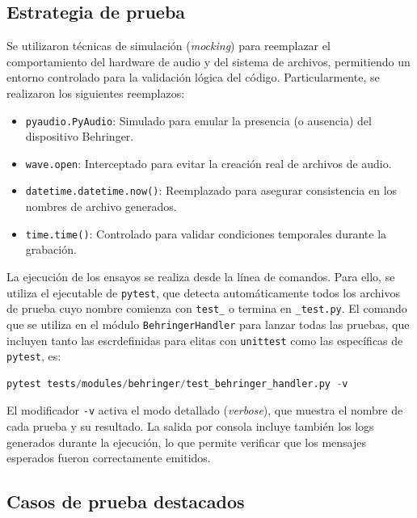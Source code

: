\subsection{Estrategia de prueba}

Se utilizaron técnicas de simulación (\textit{mocking}) para reemplazar el comportamiento del hardware de audio y del sistema de archivos, permitiendo un entorno controlado para la validación lógica del código. Particularmente, se realizaron los siguientes reemplazos:

\begin{itemize} \item \texttt{pyaudio.PyAudio}: Simulado para emular la presencia (o ausencia) del dispositivo Behringer. \item \texttt{wave.open}: Interceptado para evitar la creación real de archivos de audio. \item \texttt{datetime.datetime.now()}: Reemplazado para asegurar consistencia en los nombres de archivo generados. \item \texttt{time.time()}: Controlado para validar condiciones temporales durante la grabación. \end{itemize}

La ejecución de los ensayos se realiza desde la línea de comandos. Para ello, se utiliza el ejecutable de \texttt{pytest}, que detecta automáticamente todos los archivos de prueba cuyo nombre comienza con \texttt{test\_} o termina en \texttt{\_test.py}. El comando que se utiliza en el módulo \texttt{BehringerHandler} para lanzar todas las pruebas, que incluyen tanto las escrdefinidas para elitas con \texttt{unittest} como las específicas de \texttt{pytest}, es:

\begin{lstlisting}[language={python}]
pytest tests/modules/behringer/test_behringer_handler.py -v 
\end{lstlisting}



El modificador \texttt{-v} activa el modo detallado (\textit{verbose}), que muestra el nombre de cada prueba y su resultado. La salida por consola incluye también los logs generados durante la ejecución, lo que permite verificar que los mensajes esperados fueron correctamente emitidos.

\subsection{Casos de prueba destacados}

